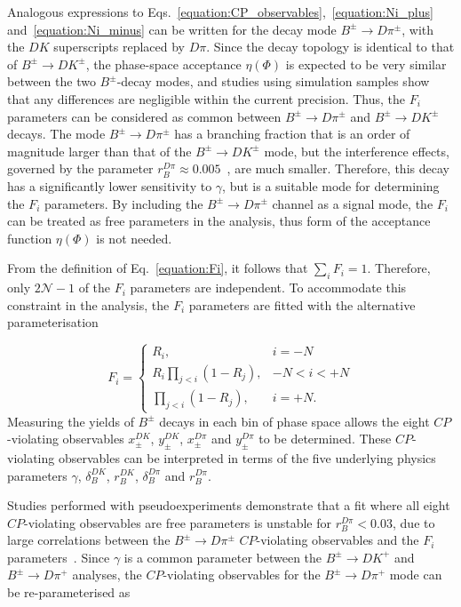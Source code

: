 \documentclass[12pt, a4paper, notitlepage, onecolumn]{article}
\begin{document}
Analogous expressions to Eqs.~\ref{equation:CP_observables},~\ref{equation:Ni_plus} and~\ref{equation:Ni_minus} can be written for the decay mode $B^\pm\to D\pi^\pm$, with the $DK$ superscripts replaced by $D\pi$. Since the decay topology is identical to that of $B^\pm\to DK^\pm$, the phase-space acceptance $\eta(\Phi)$ is expected to be very similar between the two $B^\pm$-decay modes, and studies using simulation samples show that any differences are negligible within the current precision. Thus, the $F_i$ parameters can be considered as common between $B^\pm\to D\pi^\pm$ and $B^\pm\to DK^\pm$ decays. The mode $B^\pm\to D\pi^\pm$ has a branching fraction that is an order of magnitude larger than that of the $B^\pm\to DK^\pm$ mode, but the interference effects, governed by the parameter $r_B^{D\pi}\approx 0.005$~\cite{LHCb-PAPER-2021-033}, are much smaller. Therefore, this decay has a significantly lower sensitivity to $\gamma$, but is a suitable mode for determining the $F_i$ parameters. By including the $B^\pm\to D\pi^\pm$ channel as a signal mode, the $F_i$ can be treated as free parameters in the analysis, thus form of the acceptance function $\eta(\Phi)$ is not needed.

From the definition of Eq.~\eqref{equation:Fi}, it follows that $\sum_iF_i = 1$. Therefore, only $2\mathcal{N} - 1$ of the $F_i$ parameters are independent. To accommodate this constraint in the analysis, the $F_i$ parameters are fitted with the alternative parameterisation

\begin{equation}
    F_i =
    \begin{cases}
        R_i, & i = -N \\
        R_i\prod_{j < i}(1 - R_j), & -N < i < +N \\
        \prod_{j < i}(1 - R_j), &i = +N.
    \end{cases}
\end{equation}
Measuring the yields of $B^\pm$ decays in each bin of phase space allows the eight $C\!P$-violating observables $x_\pm^{DK}$, $y_\pm^{DK}$, $x_\pm^{D\pi}$ and $y_\pm^{D\pi}$ to be determined. These $C\!P$-violating observables can be interpreted in terms of the five underlying physics parameters $\gamma$, $\delta_B^{DK}$, $r_B^{DK}$, $\delta_B^{D\pi}$ and $r_B^{D\pi}$.

Studies performed with pseudoexperiments demonstrate that a fit where all eight $C\!P$-violating observables are free parameters is unstable for $r_B^{D\pi} < 0.03$, due to large correlations between the $B^\pm\to D\pi^\pm$ $C\!P$-violating observables and the $F_i$ parameters~\cite{LHCb-PAPER-2020-019}. Since $\gamma$ is a common parameter between the $B^\pm\to DK^+$ and $B^\pm\to D\pi^+$ analyses, the $C\!P$-violating observables for the $B^\pm\to D\pi^+$ mode can be re-parameterised as
\end{document}
